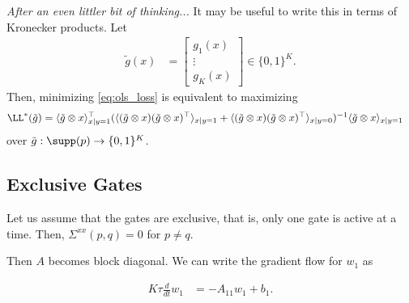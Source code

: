 \documentclass{article}
\begin{document}
\emph{After an even littler bit of thinking...}
It may be useful to write this in terms of Kronecker products.
Let
\begin{align}
  \tilde{g}(x) &= \begin{bmatrix} g_1(x) \\ \vdots \\ g_K(x) \end{bmatrix} \in \{ 0,1 \}^K.
\end{align}
Then, minimizing \cref{eq:ols_loss} is equivalent to maximizing
\begin{align}
  \LL^*(\tilde{g}) &= \langle \tilde{g} \otimes x \rangle_{x \mid y=1}^\top (\langle ( \tilde{g} \otimes x ) ( \tilde{g} \otimes x )^\top \rangle_{x \mid y=1} + \langle ( \tilde{g} \otimes x ) ( \tilde{g} \otimes x )^\top \rangle_{x \mid y=0})^{-1} \langle \tilde{g} \otimes x \rangle_{x \mid y=1} \label{eq:ols_kron}
\end{align}
over $\tilde{g} : \supp(p) \to \{0,1\}^K$.



\subsection{Exclusive Gates}
Let us assume that the gates are exclusive, that is, only one gate is active at a time.
Then, $\Sigma^{xx}(p,q) = 0$ for $p \neq q$.

Then $A$ becomes block diagonal.
We can write the gradient flow for $w_1$ as

\begin{align}
  K \tau \frac{d}{dt} w_1 &= - A_{11} w_1 + b_1.
\end{align}
\end{document}
